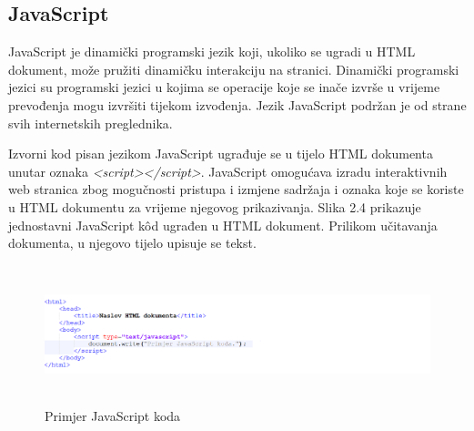 \documentclass[times, utf8, zavrsni, numeric]{fer}
\begin{document}
\subsection{JavaScript}
JavaScript je dinamički programski jezik koji, ukoliko se ugradi u HTML dokument, može pružiti dinamičku interakciju na stranici. Dinamički programski jezici su programski jezici u kojima se operacije koje se inače izvrše u vrijeme prevođenja mogu izvršiti tijekom izvođenja\cite{Dynamicp76:online}. Jezik JavaScript podržan je od strane svih internetskih preglednika.

Izvorni kod pisan jezikom JavaScript ugrađuje se u tijelo HTML dokumenta unutar oznaka \emph{<script></script>}. JavaScript omogućava izradu interaktivnih web stranica zbog mogučnosti  pristupa i izmjene sadržaja i oznaka koje se koriste u HTML dokumentu za vrijeme njegovog prikazivanja. Slika 2.4 prikazuje jednostavni JavaScript kôd ugrađen u HTML dokument. Prilikom učitavanja dokumenta, u njegovo tijelo upisuje se tekst.
\begin{figure}[htb]
\centering
\includegraphics[height=4cm]{js-example.png}
\caption{Primjer JavaScript koda}
\label{fig:basicJs}
\end{figure}
\end{document}
